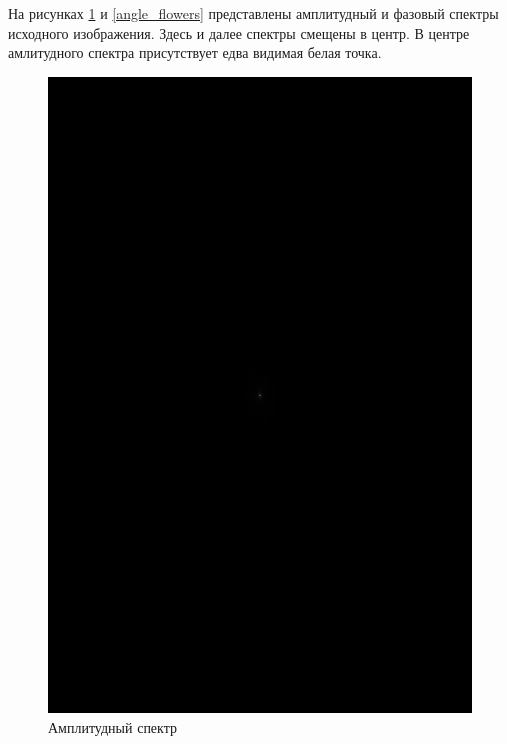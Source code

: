 \clearpage

На рисунках \ref{abs_flowers} и \ref{angle_flowers} представлены амплитудный и фазовый спектры исходного изображения. Здесь и далее спектры смещены в центр. В центре амлитудного спектра присутствует едва видимая белая точка.

\begin{figure}[!htb]
	\begin{minipage}{0.5\textwidth}
		\centering
		\includegraphics[scale=0.17]{assets/flowers_gray_abs_spectrum}
		\caption{Амплитудный спектр}\label{abs_flowers}
	\end{minipage}\hfill
	\begin{minipage}{0.5\textwidth}
		\centering

\end{minipage}
\end{figure}

